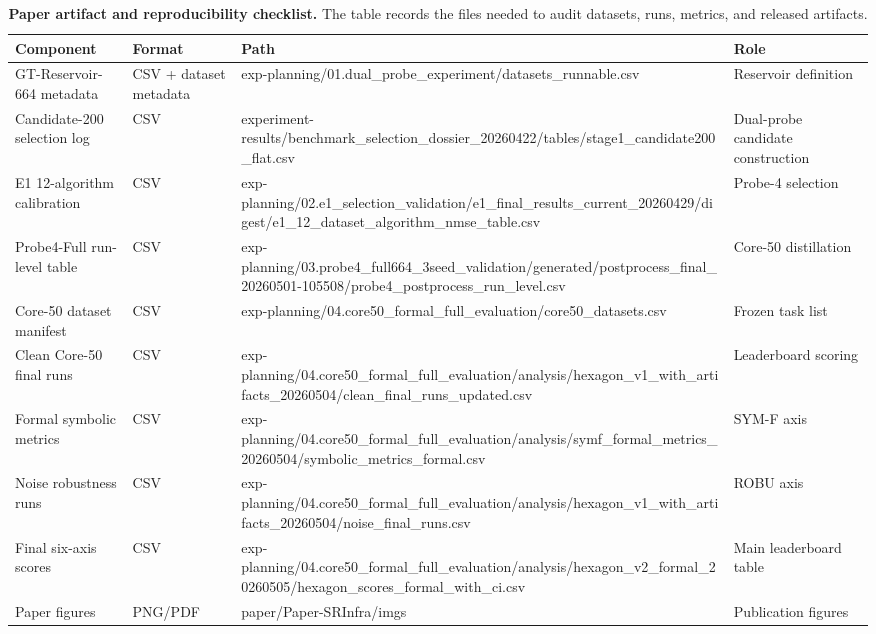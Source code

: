 \begin{table}
\caption{\textbf{Paper artifact and reproducibility checklist.} The table records the files needed to audit datasets, runs, metrics, and released artifacts.}
\label{tab:table16_artifact_checklist}
\begin{tabular}{llll}
\toprule
\textbf{Component} & \textbf{Format} & \textbf{Path} & \textbf{Role} \\
\midrule
GT-Reservoir-664 metadata & CSV + dataset metadata & exp-planning/01.dual_probe_experiment/datasets\_runnable.csv & Reservoir definition \\
Candidate-200 selection log & CSV & experiment-results/benchmark\_selection\_dossier\_20260422/tables/stage1\_candidate200\_flat.csv & Dual-probe candidate construction \\
E1 12-algorithm calibration & CSV & exp-planning/02.e1_selection_validation/e1\_final\_results\_current\_20260429/digest/e1\_12\_dataset\_algorithm\_nmse\_table.csv & Probe-4 selection \\
Probe4-Full run-level table & CSV & exp-planning/03.probe4_full664_3seed_validation/generated/postprocess\_final\_20260501-105508/probe4\_postprocess\_run\_level.csv & Core-50 distillation \\
Core-50 dataset manifest & CSV & exp-planning/04.core50_formal_full_evaluation/core50\_datasets.csv & Frozen task list \\
Clean Core-50 final runs & CSV & exp-planning/04.core50_formal_full_evaluation/analysis/hexagon\_v1\_with\_artifacts\_20260504/clean\_final\_runs\_updated.csv & Leaderboard scoring \\
Formal symbolic metrics & CSV & exp-planning/04.core50_formal_full_evaluation/analysis/symf\_formal\_metrics\_20260504/symbolic\_metrics\_formal.csv & SYM-F axis \\
Noise robustness runs & CSV & exp-planning/04.core50_formal_full_evaluation/analysis/hexagon\_v1\_with\_artifacts\_20260504/noise\_final\_runs.csv & ROBU axis \\
Final six-axis scores & CSV & exp-planning/04.core50_formal_full_evaluation/analysis/hexagon\_v2\_formal\_20260505/hexagon\_scores\_formal\_with\_ci.csv & Main leaderboard table \\
Paper figures & PNG/PDF & paper/Paper-SRInfra/imgs & Publication figures \\
\bottomrule
\end{tabular}
\end{table}
